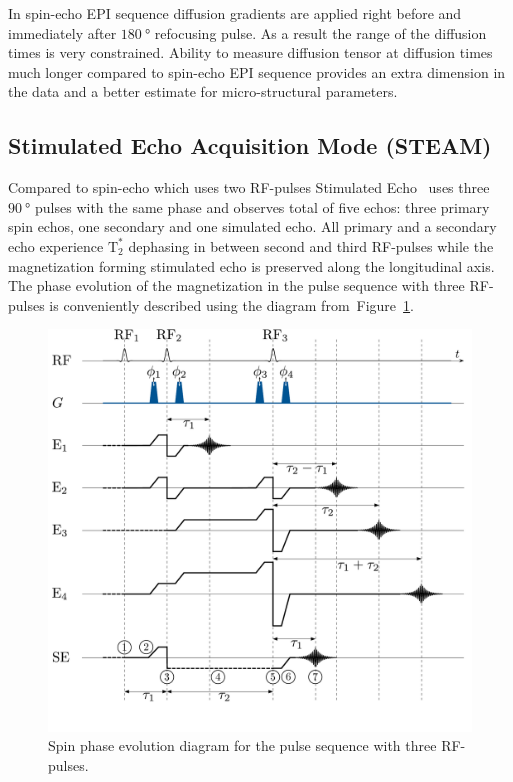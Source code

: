 In spin-echo EPI sequence diffusion gradients are applied right before and immediately after $\SI{180}{\degree}$ refocusing pulse. 
As a result the range of the diffusion times is very constrained. 
Ability to measure diffusion tensor at diffusion times much longer compared to spin-echo EPI sequence provides an extra dimension in the data and a better estimate for micro-structural parameters.
\subsection{Stimulated Echo Acquisition Mode (STEAM)}
Compared to spin-echo which uses two RF-pulses Stimulated Echo~\cite{Hahn} uses three $\SI{90}{\degree}$ pulses with the same phase and observes total of five echos: three primary spin echos, one secondary and one simulated echo. 
All primary and a secondary echo experience $\mathrm{T_2^*}$ dephasing in between second and third RF-pulses while the magnetization forming stimulated echo is preserved along the longitudinal axis. 
The phase evolution of the magnetization in the pulse sequence with three RF-pulses is conveniently described using the diagram from~Figure~\ref{fig: STEAM_phase}.
\begin{figure}[!h]
\vspace{+0.2cm}
\centering
\includegraphics[width=\textwidth]{Figures/STEAM_Phase.pdf}
\caption[Spin phase evolution diagram for the pulse sequence with three RF-pulses]{Spin phase evolution diagram for the pulse sequence with three RF-pulses.}\label{fig: STEAM_phase} 
\end{figure}
